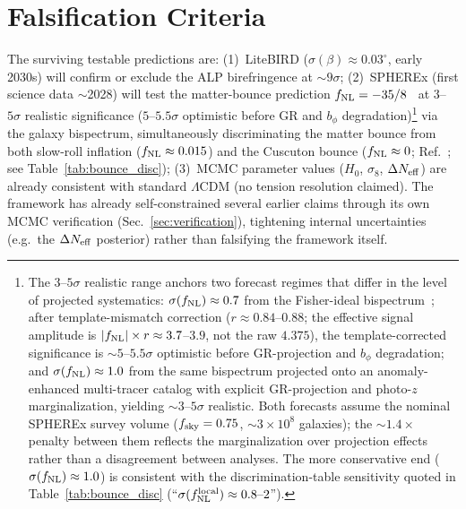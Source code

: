 \documentclass[aps,prd,twocolumn,superscriptaddress,showpacs,preprintnumbers,nofootinbib,longbibliography,floatfix]{revtex4-2}
\newcommand{\Neff}{N_{\rm eff}}
\newcommand{\fnl}{f_{\rm NL}}
\begin{document}
\section{Falsification Criteria}\label{sec:falsification}
The surviving testable predictions are: (1)~LiteBIRD ($\sigma(\beta) \approx 0.03^\circ$, early 2030s) will confirm or exclude the ALP birefringence at $\sim 9\sigma$; (2)~SPHEREx (first science data $\sim$2028) will test the matter-bounce prediction $\fnl = -35/8$~\cite{Cai:2009fn} at $3$--$5\sigma$ realistic significance ($5$--$5.5\sigma$ optimistic before GR and $b_\phi$ degradation)\footnote{\label{fn:spherex_range}The $3$--$5\sigma$ realistic range anchors two forecast regimes that differ in the level of projected systematics: $\sigma(\fnl) \approx 0.7$ from the Fisher-ideal bispectrum~\cite{Heinrich:2023}; after template-mismatch correction ($r \approx 0.84$--$0.88$; the effective signal amplitude is $|\fnl| \times r \approx 3.7$--$3.9$, not the raw $4.375$), the template-corrected significance is ${\sim}5$--$5.5\sigma$ optimistic before GR-projection and $b_\phi$ degradation; and $\sigma(\fnl) \approx 1.0$ from the same bispectrum projected onto an anomaly-enhanced multi-tracer catalog with explicit GR-projection and photo-$z$ marginalization, yielding ${\sim}3$--$5\sigma$ realistic. Both forecasts assume the nominal SPHEREx survey volume ($f_{\rm sky} = 0.75$, $\sim\!3\times 10^8$ galaxies); the ${\sim}\!1.4\times$ penalty between them reflects the marginalization over projection effects rather than a disagreement between analyses. The more conservative end ($\sigma(\fnl) \approx 1.0$) is consistent with the discrimination-table sensitivity quoted in Table~\ref{tab:bounce_disc} (``$\sigma(\fnl^{\rm local}) \approx 0.8\text{--}2$'').} via the galaxy bispectrum, simultaneously discriminating the matter bounce from both slow-roll inflation ($\fnl \approx 0.015$) and the Cuscuton bounce ($\fnl \approx 0$; Ref.~\cite{Dehghani:2025cusc}; see Table~\ref{tab:bounce_disc}); (3)~MCMC parameter values ($H_0$, $\sigma_8$, $\Delta\Neff$) are already consistent with standard $\Lambda$CDM (no tension resolution claimed). The framework has already self-constrained several earlier claims through its own MCMC verification (Sec.~\ref{sec:verification}), tightening internal uncertainties (e.g.\ the $\Delta\Neff$ posterior) rather than falsifying the framework itself.

\label{sec:conjunctive}
\end{document}
